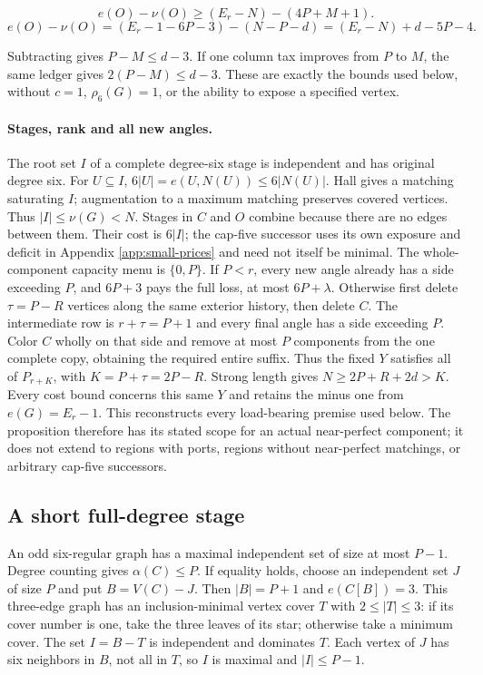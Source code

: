 \documentclass[11pt,a4paper]{article}
\theoremstyle{definition}
\begin{document}
\[
 e(O)-\nu(O)\ge(E_r-N)-(4P+M+1).
\]
\[
 e(O)-\nu(O)=(E_r-1-6P-3)-(N-P-d)
              =(E_r-N)+d-5P-4.
\]

Subtracting gives $P-M\le d-3$. If one column tax improves from $P$ to $M$, the same ledger gives $2(P-M)\le d-3$. These are exactly the bounds used below, without $c=1$, $\rho_6(G)=1$, or the ability to expose a specified vertex.

\paragraph{Stages, rank and all new angles.}
The root set $I$ of a complete degree-six stage is independent and has original degree six. For $U\subseteq I$, $6|U|=e(U,N(U))\le6|N(U)|$. Hall gives a matching saturating $I$; augmentation to a maximum matching preserves covered vertices. Thus $|I|\le\nu(G)<N$. Stages in $C$ and $O$ combine because there are no edges between them. Their cost is $6|I|$; the cap-five successor uses its own exposure and deficit in Appendix \ref{app:small-prices} and need not itself be minimal.
The whole-component capacity menu is $\{0,P\}$. If $P<r$, every new angle already has a side exceeding $P$, and $6P+3$ pays the full loss, at most $6P+\lambda$. Otherwise first delete $\tau=P-R$ vertices along the same exterior history, then delete $C$. The intermediate row is $r+\tau=P+1$ and every final angle has a side exceeding $P$. Color $C$ wholly on that side and remove at most $P$ components from the one complete copy, obtaining the required entire suffix. Thus the fixed $Y$ satisfies all of $P_{r+K}$, with $K=P+\tau=2P-R$. Strong length gives $N\ge2P+R+2d>K$. Every cost bound concerns this same $Y$ and retains the minus one from $e(G)=E_r-1$.
This reconstructs every load-bearing premise used below. The proposition therefore has its stated scope for an actual near-perfect component; it does not extend to regions with ports, regions without near-perfect matchings, or arbitrary cap-five successors.

\subsection{A short full-degree stage}
An odd six-regular graph has a maximal independent set of size at most $P-1$. Degree counting gives $\alpha(C)\le P$. If equality holds, choose an independent set $J$ of size $P$ and put $B=V(C)-J$. Then $|B|=P+1$ and $e(C[B])=3$. This three-edge graph has an inclusion-minimal vertex cover $T$ with $2\le|T|\le3$: if its cover number is one, take the three leaves of its star; otherwise take a minimum cover. The set $I=B-T$ is independent and dominates $T$. Each vertex of $J$ has six neighbors in $B$, not all in $T$, so $I$ is maximal and $|I|\le P-1$.
\end{document}
